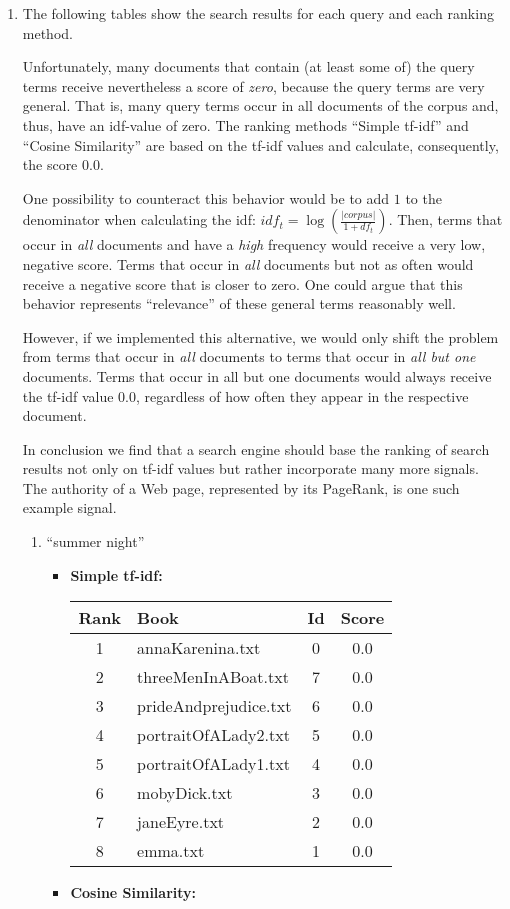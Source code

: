 \documentclass[a4paper,11pt,oneside]{book}
\begin{document}
\begin{enumerate}
		
		\item The following tables show the search results for each query and each ranking method.
		
					Unfortunately, many documents that contain (at least some of) the query terms receive nevertheless a score of \emph{zero}, because the query terms are very general. That is, many query terms occur in all documents of the corpus and, thus, have an idf-value of zero. The ranking methods ``Simple tf-idf'' and ``Cosine Similarity'' are based on the tf-idf values and calculate, consequently, the score $0.0$. 
					
					One possibility to counteract this behavior would be to add $1$ to the denominator when calculating the idf: $idf_t = \log(\frac{|corpus|}{1+df_t})$. Then, terms that occur in \emph{all} documents and have a \emph{high} frequency would receive a very low, negative score. Terms that occur in \emph{all} documents but not as often would receive a negative score that is closer to zero. One could argue that this behavior represents ``relevance'' of these general terms reasonably well.
					
					However, if we implemented this alternative, we would only shift the problem from terms that occur in \emph{all} documents to terms that occur in \emph{all but one} documents. Terms that occur in all but one documents would always receive the tf-idf value 0.0, regardless of how often they appear in the respective document.
					
					In conclusion we find that a search engine should base the ranking of search results not only on tf-idf values but rather incorporate many more signals. The authority of a Web page, represented by its PageRank, is one such example signal.
		
		\begin{enumerate}
			\item ``summer night''
						\begin{itemize}
							\item \textbf{Simple tf-idf:}
							
										\begin{tabular}{clcc}
											\toprule
												\textbf{Rank} & \textbf{Book} & \textbf{Id} & \textbf{Score}\\
											\hline
												1	&	annaKarenina.txt	&	0	&	0.0	\\
												2	&	threeMenInABoat.txt	&	7	&	0.0	\\
												3	&	prideAndprejudice.txt	&	6	&	0.0	\\
												4	&	portraitOfALady2.txt	&	5	&	0.0	\\
												5	&	portraitOfALady1.txt	&	4	&	0.0	\\
												6	&	mobyDick.txt	&	3	&	0.0	\\
												7	&	janeEyre.txt	&	2	&	0.0	\\
												8	&	emma.txt	&	1	&	0.0	\\
											\bottomrule
										\end{tabular}\newline
							\item \textbf{Cosine Similarity:}
							

\end{itemize}
\end{enumerate}
\end{enumerate}
\end{document}

